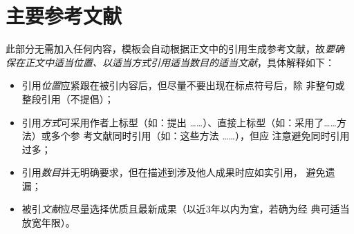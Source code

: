 \section{主要参考文献}

\begin{tcolorbox}
	此部分无需加入任何内容，模板会自动根据正文中的引用生成参考文献，故\emph{要确
		保在正文中适当位置、以适当方式引用适当数目的适当文献}，具体解释如下：
	\begin{itemize}
		\item 引用\emph{位置}应紧跟在被引内容后，但尽量不要出现在标点符号后，除
		      非整句或整段引用（不提倡）；
		\item 引用\emph{方式}可采用作者上标型（如：\citet{chen1980zhongguo}提出
		      ……）、直接上标型（如：采用了……方法\citep{chen2005zhulu}）或多个参
		      考文献同时引用（如：这些方法
		      \citep{Bohan1928,chu2004tushu,Dubrovin1906,hls2012jinji}……），但应
		      注意避免同时引用过多；
		\item 引用\emph{数目}并无明确要求，但在描述到涉及他人成果时应如实引用，
		      避免遗漏；
		\item 被引\emph{文献}应尽量选择优质且最新成果（以近3年以内为宜，若确为经
		      典可适当放宽年限）。
	\end{itemize}
\end{tcolorbox}
